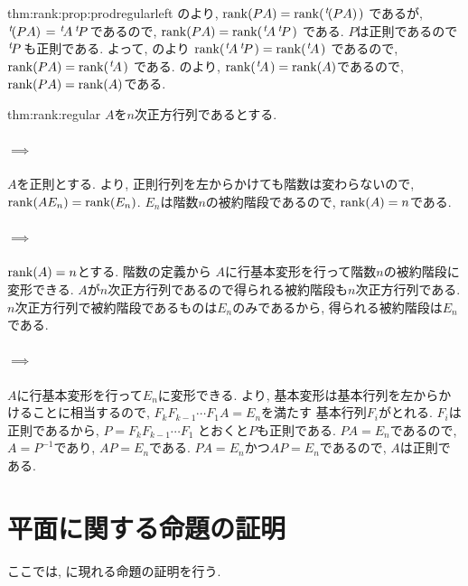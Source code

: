 \begin{proofof*}{thm:rank:prop:prod}{regularleft}
  のより,
  $\operatorname{rank}(PA)=\operatorname{rank}({\left.^{t}\!(PA)\right.})$
  であるが, ${\left.^{t}\!(PA)\right.}={\left.^{t}\!A\right.}{\left.^{t}\!P\right.}$であるので,
  $\operatorname{rank}(PA)=\operatorname{rank}({\left.^{t}\!A\right.}{\left.^{t}\!P\right.})$
  である.
  $P$は正則であるので${\left.^{t}\!P\right.}$も正則である.
  よって, のより
  $\operatorname{rank}({\left.^{t}\!A\right.}{\left.^{t}\!P\right.})=\operatorname{rank}({\left.^{t}\!A\right.})$
  であるので,
  $\operatorname{rank}(PA)=\operatorname{rank}({\left.^{t}\!A\right.})$
  である.
  のより,
  $\operatorname{rank}({\left.^{t}\!A\right.})=\operatorname{rank}(A)$であるので,
  $\operatorname{rank}(PA)= \operatorname{rank}(A)$である.
\end{proofof*}

\begin{proofof}{thm:rank:regular}
  $A$を$n$次正方行列であるとする.
  \paragraph{$\implies$}
  $A$を正則とする.
  より, 正則行列を左からかけても階数は変わらないので,
  $\operatorname{rank}(AE_n)=\operatorname{rank}(E_n)$.
  $E_n$は階数$n$の被約階段であるので,
  $\operatorname{rank}(A)=n$である.
  \paragraph{$\implies$}
  $\operatorname{rank}(A)=n$とする.
  階数の定義から
  $A$に行基本変形を行って階数$n$の被約階段に変形できる.
  $A$が$n$次正方行列であるので得られる被約階段も$n$次正方行列である.
  $n$次正方行列で被約階段であるものは$E_n$のみであるから,
  得られる被約階段は$E_n$である.
  \paragraph{$\implies$}
  $A$に行基本変形を行って$E_n$に変形できる.
  より, 基本変形は基本行列を左からかけることに相当するので,
  $F_kF_{k-1}\cdots F_1 A=E_n$を満たす
  基本行列$F_i$がとれる.  $F_i$は正則であるから,
  $P=F_kF_{k-1}\cdots F_1$
  とおくと$P$も正則である.
  $PA=E_n$であるので, $A=P^{-1}$であり, $AP=E_n$である.
  $PA=E_n$かつ$AP=E_n$であるので, $A$は正則である.
\end{proofof}

\section{平面に関する命題の証明}
ここでは, に現れる命題の証明を行う.

